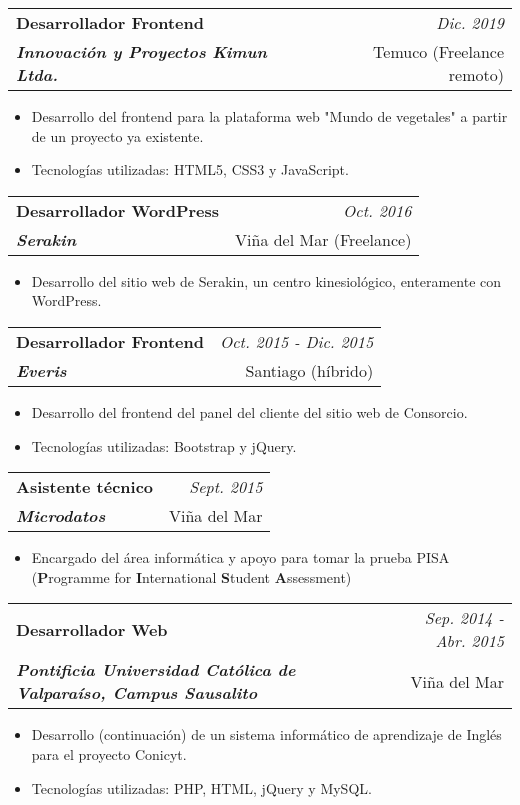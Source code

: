 \documentclass[a4paper,11pt]{article}
\makeatletter
\newcommand{\resumeSubheading}[4]{
\vspace{0.5mm}\item
    \begin{tabular*}{0.98\textwidth}[t]{l@{\extracolsep{\fill}}r}
        \textbf{#1} & \textit{\footnotesize{#4}} \\
        \textit{\textbf {\footnotesize{#3}}} &  \footnotesize{#2}\\
    \end{tabular*}
    \vspace{-2.4mm}
}
\newcommand{\resumeItemListStart}{\begin{justify}\begin{itemize}[leftmargin=3ex, rightmargin=2ex, noitemsep,labelsep=1.2mm,itemsep=0mm]\small}
\newcommand{\resumeItemListEnd}{\end{itemize}\end{justify}\vspace{-2mm}}
\makeatother
\begin{document}
    \vspace{-3.0mm}
    
    \resumeSubheading
      {Desarrollador Frontend}{Temuco (Freelance remoto)}
      {Innovación y Proyectos Kimun Ltda.}{Dic. 2019}
      \vspace{-2.0mm}
      \resumeItemListStart
    \item {Desarrollo del frontend para la plataforma web "Mundo de vegetales" a partir de un proyecto ya existente.}
    \item {Tecnologías utilizadas: HTML5, CSS3 y JavaScript.}
    \resumeItemListEnd
    
    \vspace{-3.0mm}
    
    \resumeSubheading
      {Desarrollador WordPress}{Viña del Mar (Freelance)}
      {Serakin}{Oct. 2016}
      \vspace{-2.0mm}
      \resumeItemListStart
    \item {Desarrollo del sitio web de Serakin, un centro kinesiológico, enteramente con WordPress.}
    \resumeItemListEnd
    
    \vspace{-3.0mm}
    
    \resumeSubheading
      {Desarrollador Frontend}{Santiago (híbrido)}
      {Everis}{Oct. 2015 - Dic. 2015}
      \vspace{-2.0mm}
      \resumeItemListStart
    \item {Desarrollo del frontend del panel del cliente del sitio web de Consorcio.}
    \item {Tecnologías utilizadas: Bootstrap y jQuery.}
    \resumeItemListEnd
    
    \vspace{-3.0mm}
    
    \resumeSubheading
      {Asistente técnico}{Viña del Mar}
      {Microdatos}{Sept. 2015}
      \vspace{-2.0mm}
      \resumeItemListStart
    \item {Encargado del área informática y apoyo para tomar la prueba PISA (\textbf{P}rogramme for \textbf{I}nternational \textbf{S}tudent \textbf{A}ssessment)}
    \resumeItemListEnd
    
    \vspace{-3.0mm}
    
    \resumeSubheading
      {Desarrollador Web}{Viña del Mar}
      {Pontificia Universidad Católica de Valparaíso, Campus Sausalito}{Sep. 2014 - Abr. 2015}
      \vspace{-2.0mm}
      \resumeItemListStart
    \item {Desarrollo (continuación) de un sistema informático de aprendizaje de Inglés para el proyecto Conicyt.}
    \item {Tecnologías utilizadas: PHP, HTML, jQuery y MySQL.}
    \resumeItemListEnd
    
\end{document}
